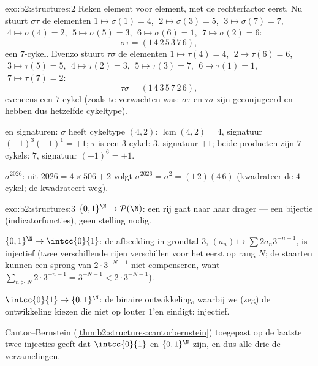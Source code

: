 \begin{solution}{exo:b2:structures:2}
Reken element voor element, met de rechterfactor eerst. Nu stuurt
$\sigma\tau$ de elementen $1 \mapsto \sigma(1) = 4$, $\;2 \mapsto
\sigma(3) = 5$, $\;3 \mapsto \sigma(7) = 7$, $\;4 \mapsto
\sigma(4) = 2$, $\;5 \mapsto \sigma(5) = 3$, $\;6 \mapsto
\sigma(6) = 1$, $\;7 \mapsto \sigma(2) = 6$:
\[
\sigma\tau = (1\,4\,2\,5\,3\,7\,6),
\]
een $7$-cykel. Evenzo stuurt $\tau\sigma$ de elementen $1 \mapsto
\tau(4) = 4$, $\;2 \mapsto \tau(6) = 6$, $\;3 \mapsto \tau(5) =
5$, $\;4 \mapsto \tau(2) = 3$, $\;5 \mapsto \tau(3) = 7$, $\;6
\mapsto \tau(1) = 1$, $\;7 \mapsto \tau(7) = 2$:
\[
\tau\sigma = (1\,4\,3\,5\,7\,2\,6),
\]
eveneens een $7$-cykel (zoals te verwachten was: $\sigma\tau$ en
$\tau\sigma$ zijn geconjugeerd en hebben dus hetzelfde cykeltype).

 en signaturen: $\sigma$ heeft cykeltype $(4,2)$: 
$\operatorname{lcm}(4,2) = 4$, signatuur $(-1)^3(-1)^1 = +1$;
$\tau$ is een $3$-cykel:  $3$, signatuur $+1$; beide producten
zijn $7$-cykels:  $7$, signatuur $(-1)^6 = +1$.

$\sigma^{2026}$: uit $2026 = 4 \times 506 + 2$ volgt
$\sigma^{2026} = \sigma^2 = (1\,2)(4\,6)$ (kwadrateer de
$4$-cykel; de  kwadrateert weg).
\end{solution}

\begin{solution}{exo:b2:structures:3}
$\{0,1\}^{\N} \to \mathcal{P}(\N)$: een rij gaat naar haar drager
--- een bijectie (indicatorfuncties), geen stelling nodig.

$\{0,1\}^{\N} \to \intcc{0}{1}$: de afbeelding in grondtal $3$,
$(a_n) \mapsto \sum 2a_n 3^{-n-1}$, is injectief (twee
verschillende rijen verschillen voor het eerst op rang $N$; de
staarten kunnen een sprong van $2\cdot 3^{-N-1}$ niet compenseren,
want $\sum_{n > N} 2\cdot 3^{-n-1} = 3^{-N-1} < 2\cdot3^{-N-1}$).

$\intcc{0}{1} \to \{0,1\}^{\N}$: de binaire ontwikkeling, waarbij
we (zeg) de ontwikkeling kiezen die niet op louter $1$'en eindigt:
injectief.

Cantor--Bernstein (\cref{thm:b2:structures:cantorbernstein})
toegepast op de laatste twee injecties geeft dat $\intcc{0}{1}$ en
$\{0,1\}^{\N}$  zijn, en dus alle drie de
verzamelingen.
\end{solution}

